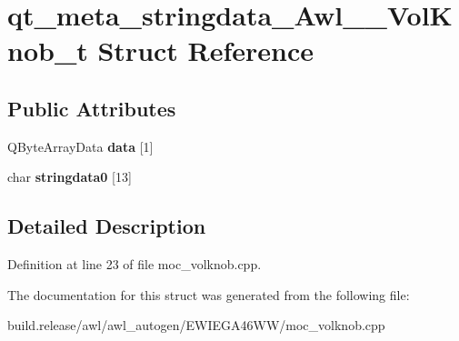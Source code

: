 \hypertarget{structqt__meta__stringdata___awl_____vol_knob__t}{}\section{qt\+\_\+meta\+\_\+stringdata\+\_\+\+Awl\+\_\+\+\_\+\+Vol\+Knob\+\_\+t Struct Reference}
\label{structqt__meta__stringdata___awl_____vol_knob__t}
\subsection*{Public Attributes}
\begin{DoxyCompactItemize}
\item 
\mbox{\label{structqt__meta__stringdata___awl_____vol_knob__t_aa1b08715a9e74ad408841db09623a6d0}} 
Q\+Byte\+Array\+Data {\bfseries data} \mbox{[}1\mbox{]}
\item 
\mbox{\label{structqt__meta__stringdata___awl_____vol_knob__t_a2e33fd2e24f08abe857beeb4943d0dc8}} 
char {\bfseries stringdata0} \mbox{[}13\mbox{]}
\end{DoxyCompactItemize}


\subsection{Detailed Description}


Definition at line 23 of file moc\+\_\+volknob.\+cpp.



The documentation for this struct was generated from the following file\+:\begin{DoxyCompactItemize}
\item 
build.\+release/awl/awl\+\_\+autogen/\+E\+W\+I\+E\+G\+A46\+W\+W/moc\+\_\+volknob.\+cpp\end{DoxyCompactItemize}
